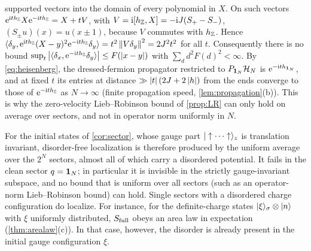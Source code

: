 \begin{remark}
\begin{enumerate}[label=(\roman*)]
supported vectors into the domain of every polynomial in $X$.  On such vectors
$\mathrm{e}^{\mathrm{i} th_{\mathbb{Z}}}X\mathrm{e}^{-\mathrm{i} th_{\mathbb{Z}}}=X+tV$, with $V=\mathrm{i}[h_{\mathbb{Z}},X]=-\mathrm{i} J(S_+-S_-)$, $(S_\pm u)(x)=u(x\pm1)$,
because $V$ commutes with $h_{\mathbb{Z}}$.  Hence
$\langle\delta_y,\mathrm{e}^{\mathrm{i} th_{\mathbb{Z}}}(X-y)^2\mathrm{e}^{-\mathrm{i} th_{\mathbb{Z}}}\delta_y\rangle=t^2\left\|V\delta_y\right\|^2=2J^2t^2$
for all $t$.  Consequently there is no bound
$\sup_t\left|\langle\delta_x,\mathrm{e}^{-\mathrm{i} th_{\mathbb{Z}}}\delta_y\rangle\right|\le F(\left|x-y\right|)$ with
$\sum_dd^2F(d)^2<\infty$.  By \eqref{eq:heisenberg}, the dressed-fermion propagator restricted to
$P_{\mathbf{1}_N}\mathcal{H}_N$ is $\mathrm{e}^{-\mathrm{i} th_{\mathbf{1}_N}}$, and at fixed $t$ its entries at distance $\gg\left|t\right|(2J+2\left|h\right|)$
from the ends converge to those of $\mathrm{e}^{-\mathrm{i} th_{\mathbb{Z}}}$ as $N\to\infty$ (finite propagation speed,
\cref{lem:propagation}(b)).  This is why the zero-velocity Lieb--Robinson bound of \cref{prop:LR} can only
hold on average over sectors, and not in operator norm uniformly in $N$.
\end{enumerate}
For the initial states of \cref{cor:sector}, whose gauge part $|\uparrow\cdots\uparrow\rangle_z$ is translation
invariant, disorder-free localization is therefore produced by the uniform average over the $2^N$
sectors, almost all of which carry a disordered potential.  It fails in the clean sector $q=\mathbf{1}_N$; in
particular it is invisible in the strictly gauge-invariant subspace, and no bound that is uniform over all
sectors (such as an operator-norm Lieb--Robinson bound) can hold.  Single sectors with a disordered charge
configuration do localize.  For instance, for the definite-charge states $|\xi\rangle_\sigma\otimes|n\rangle$
with $\xi$ uniformly distributed, $S_{\mathrm{full}}$ obeys an area law in expectation (\cref{thm:arealaw}(c)).  In
that case, however, the disorder is already present in the initial gauge configuration $\xi$.
\end{remark}


